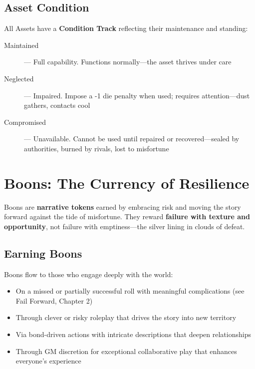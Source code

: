 \subsection*{Asset Condition}

All Assets have a \textbf{Condition Track} reflecting their maintenance and standing:

\begin{description}
    \item[Maintained] --- Full capability. Functions normally—the asset thrives under care
    \item[Neglected] --- Impaired. Impose a -1 die penalty when used; requires attention—dust gathers, contacts cool
    \item[Compromised] --- Unavailable. Cannot be used until repaired or recovered—sealed by authorities, burned by rivals, lost to misfortune
\end{description}

\section*{Boons: The Currency of Resilience}

Boons are \textbf{narrative tokens} earned by embracing risk and moving the story forward against the tide of misfortune. They reward \textbf{failure with texture and opportunity}, not failure with emptiness—the silver lining in clouds of defeat.

\subsection*{Earning Boons}

Boons flow to those who engage deeply with the world:

\begin{itemize}
    \item On a missed or partially successful roll with meaningful complications (see Fail Forward, Chapter 2)
    \item Through clever or risky roleplay that drives the story into new territory
    \item Via bond-driven actions with intricate descriptions that deepen relationships
    \item Through GM discretion for exceptional collaborative play that enhances everyone's experience
\end{itemize}

